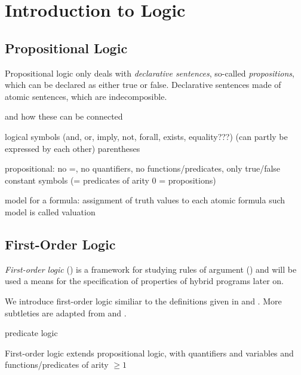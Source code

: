 \chapter{Introduction to Logic}
    \label{sec:introduction-logic}

    \section{Propositional Logic}
        \label{sec:propositional-logic}

        \cite{Huth04LogicInCS}


        Propositional logic only deals with \emph{declarative sentences}, so-called \emph{propositions}, which can be declared as either true or false.
        Declarative sentences made of atomic sentences, which are indecomposible.


        and how these can be connected


        logical symbols (and, or, imply, not, forall, exists, equality???) (can partly be expressed by each other)
        parentheses


        propositional: no =, no quantifiers, no functions/predicates, only true/false constant symbols (= predicates of arity 0 = propositions)

        model for a formula: assignment of truth values to each atomic formula
        such model is called valuation


    \section{First-Order Logic}
        \label{sec:first-order-logic}

        \emph{First-order logic} (\FOL) is a framework for studying rules of argument (\cite{Hodges01ClassicalLogic}) and will be used a means for the specification of properties of hybrid programs later on.

        We introduce first-order logic similiar to the definitions given in \cite{Platzer10HybridSystems} and \cite{Huth04LogicInCS}. More subtleties are adapted from \cite{Hodges01ClassicalLogic} and \cite{Rautenberg10ConciseLogic}.


        predicate logic

        First-order logic extends propositional logic,
        with quantifiers
        and variables
        and functions/predicates of arity $\geq 1$

